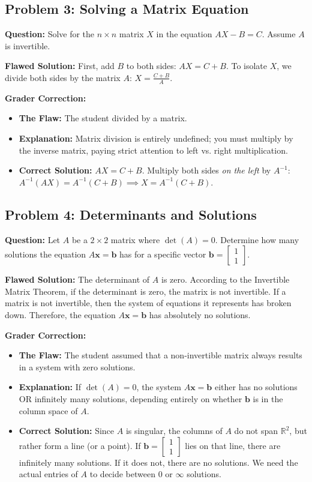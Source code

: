 \documentclass[12pt]{article}
\begin{document}
\subsection{Problem 3: Solving a Matrix Equation}
\textbf{Question:} Solve for the $n \times n$ matrix $X$ in the equation $AX - B = C$. Assume $A$ is invertible.

\textbf{Flawed Solution:}
First, add $B$ to both sides:
$AX = C + B$.
To isolate $X$, we divide both sides by the matrix $A$:
$X = \frac{C + B}{A}$.

\textbf{Grader Correction:}
\begin{itemize}
    \item \textbf{The Flaw:} The student divided by a matrix.
    \item \textbf{Explanation:} Matrix division is entirely undefined; you must multiply by the inverse matrix, paying strict attention to left vs. right multiplication.
    \item \textbf{Correct Solution:} $AX = C + B$. Multiply both sides \emph{on the left} by $A^{-1}$: $A^{-1}(AX) = A^{-1}(C + B) \implies X = A^{-1}(C + B)$.
\end{itemize}

\subsection{Problem 4: Determinants and Solutions}
\textbf{Question:} Let $A$ be a $2 \times 2$ matrix where $\det(A) = 0$. Determine how many solutions the equation $A\mathbf{x} = \mathbf{b}$ has for a specific vector $\mathbf{b} = \begin{bmatrix} 1 \\ 1 \end{bmatrix}$.

\textbf{Flawed Solution:}
The determinant of $A$ is zero. According to the Invertible Matrix Theorem, if the determinant is zero, the matrix is not invertible. If a matrix is not invertible, then the system of equations it represents has broken down. Therefore, the equation $A\mathbf{x} = \mathbf{b}$ has absolutely no solutions. 

\textbf{Grader Correction:}
\begin{itemize}
    \item \textbf{The Flaw:} The student assumed that a non-invertible matrix always results in a system with zero solutions.
    \item \textbf{Explanation:} If $\det(A) = 0$, the system $A\mathbf{x} = \mathbf{b}$ either has no solutions OR infinitely many solutions, depending entirely on whether $\mathbf{b}$ is in the column space of $A$.
    \item \textbf{Correct Solution:} Since $A$ is singular, the columns of $A$ do not span $\mathbb{R}^2$, but rather form a line (or a point). If $\mathbf{b} = \begin{bmatrix} 1 \\ 1 \end{bmatrix}$ lies on that line, there are infinitely many solutions. If it does not, there are no solutions. We need the actual entries of $A$ to decide between 0 or $\infty$ solutions.
\end{itemize}
\end{document}
